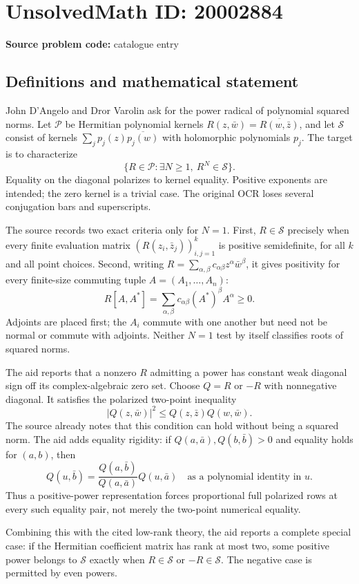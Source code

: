\documentclass[11pt]{article}
\begin{document}
\section*{UnsolvedMath ID: 20002884}
\textbf{Source problem code:} catalogue entry
\subsection{Definitions and mathematical statement}
John D'Angelo and Dror Varolin ask for the power radical of polynomial squared norms. Let $\mathcal P$ be Hermitian polynomial kernels $R(z,\bar w)=\overline{R(w,\bar z)}$, and let $\mathcal S$ consist of kernels $\sum_jp_j(z)\overline{p_j(w)}$ with holomorphic polynomials $p_j$. The target is to characterize
\[
 \{R\in\mathcal P:\exists N\ge1,\ R^N\in\mathcal S\}.
\]
Equality on the diagonal polarizes to kernel equality. Positive exponents are intended; the zero kernel is a trivial case. The original OCR loses several conjugation bars and superscripts.

The source records two exact criteria only for $N=1$. First, $R\in\mathcal S$ precisely when every finite evaluation matrix $(R(z_i,\bar z_j))_{i,j=1}^k$ is positive semidefinite, for all $k$ and all point choices. Second, writing $R=\sum_{\alpha,\beta}c_{\alpha\beta}z^\alpha\bar w^\beta$, it gives positivity for every finite-size commuting tuple $A=(A_1,\ldots,A_n)$:
\[
 R[A,A^*]=\sum_{\alpha,\beta}c_{\alpha\beta}(A^*)^\beta A^\alpha\ge0.
\]
Adjoints are placed first; the $A_i$ commute with one another but need not be normal or commute with adjoints. Neither $N=1$ test by itself classifies roots of squared norms.

The aid reports that a nonzero $R$ admitting a power has constant weak diagonal sign off its complex-algebraic zero set. Choose $Q=R$ or $-R$ with nonnegative diagonal. It satisfies the polarized two-point inequality
\[
 |Q(z,\bar w)|^2\le Q(z,\bar z)Q(w,\bar w).
\]
The source already notes that this condition can hold without being a squared norm. The aid adds equality rigidity: if $Q(a,\bar a),Q(b,\bar b)>0$ and equality holds for $(a,b)$, then
\[
 Q(u,\bar b)=\frac{Q(a,\bar b)}{Q(a,\bar a)}Q(u,\bar a)
 \quad\text{as a polynomial identity in }u.
\]
Thus a positive-power representation forces proportional full polarized rows at every such equality pair, not merely the two-point numerical equality.

Combining this with the cited low-rank theory, the aid reports a complete special case: if the Hermitian coefficient matrix has rank at most two, some positive power belongs to $\mathcal S$ exactly when $R\in\mathcal S$ or $-R\in\mathcal S$. The negative case is permitted by even powers.
\end{document}
